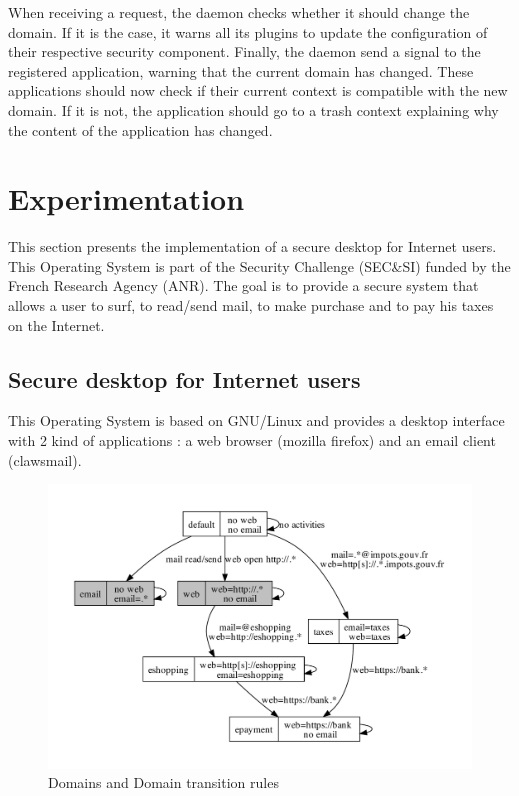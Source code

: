 \documentclass[conference]{IEEEtran}
\begin{document}
			When receiving a request, the daemon checks whether it should change the domain. If it is the case, it warns all its plugins to update the configuration of
			their respective security component. Finally, the daemon send a signal to the registered application, warning that the current domain has changed. 
			These applications should now check if their current context is compatible with the new domain. If it is not, the application should go to a trash context explaining
			why the content of the application has changed.

\section{Experimentation}

This section presents the implementation of a secure desktop for Internet users.
This Operating System is part of the Security Challenge (SEC\&SI) funded by the French Research Agency (ANR).
The goal is to provide a secure system that allows a user to surf, to read/send mail, to make purchase and to pay his taxes on the Internet.

	\subsection{Secure desktop for Internet users}

This Operating System is based on GNU/Linux and provides a desktop interface with 2 kind of applications : a web browser (mozilla firefox) and an email client (clawsmail).
	
			\begin{figure}[ht!]
				\centering
				\includegraphics[scale=0.8]{transitions.pdf}
				\caption{Domains and Domain transition rules}
				\label{transitions}
			\end{figure}
\end{document}
